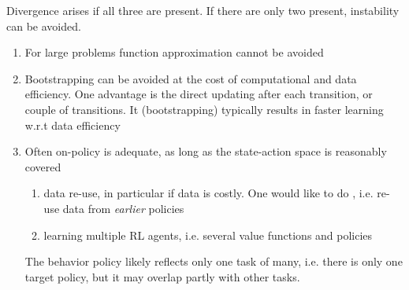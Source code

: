 Divergence arises if all three are present. 
If there are only two present, instability can be avoided.
\begin{enumerate}
    \item For large problems function approximation cannot be avoided
    \item Bootstrapping can be avoided at the cost of computational and data efficiency. One advantage is the direct updating after each transition, or couple of transitions. It (bootstrapping) typically results in faster learning w.r.t data efficiency 
    \item Often on-policy is adequate, as long as the state-action space is reasonably covered \begin{enumerate}
        \item data re-use, in particular if data is costly. One would like to do , i.e. re-use data from \textit{earlier} policies
        \item learning multiple RL agents, i.e. several value functions and policies 
    \end{enumerate} 
              The behavior policy likely reflects only one task of many, i.e. there is only one target policy, but it may overlap partly with other tasks.
\end{enumerate}



